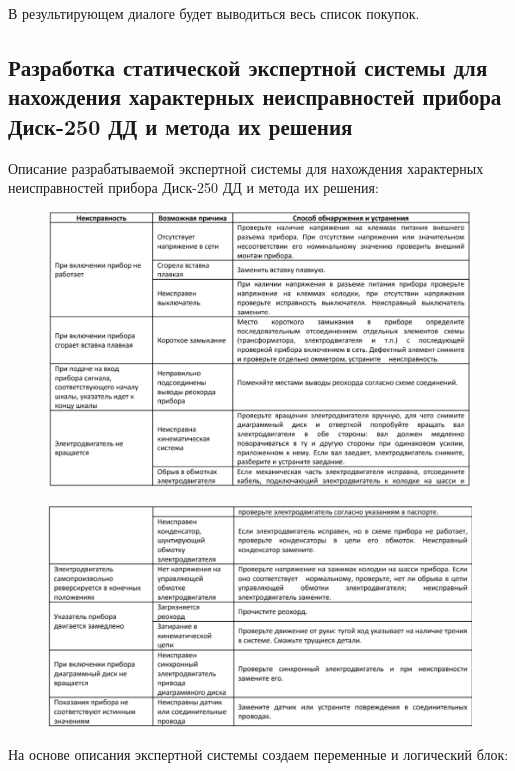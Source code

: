 \documentclass[14pt,a4paper,report]{report}
\begin{document}
В результирующем диалоге будет выводиться весь список покупок.


\subsection{Разработка статической экспертной системы для нахождения характерных неисправностей прибора Диск-250 ДД и метода их решения}

Описание разрабатываемой экспертной системы для нахождения характерных неисправностей прибора Диск-250 ДД и метода их решения:

\begin{figure}[h!]
	\centering
	\includegraphics[scale = 0.65]{images/7_x1.png}
\end{figure}

\begin{figure}[h!]
	\centering
	\includegraphics[scale = 0.65]{images/7_x2.png}
\end{figure}

\clearpage
На основе описания экспертной системы создаем переменные и логический блок:
\end{document}
